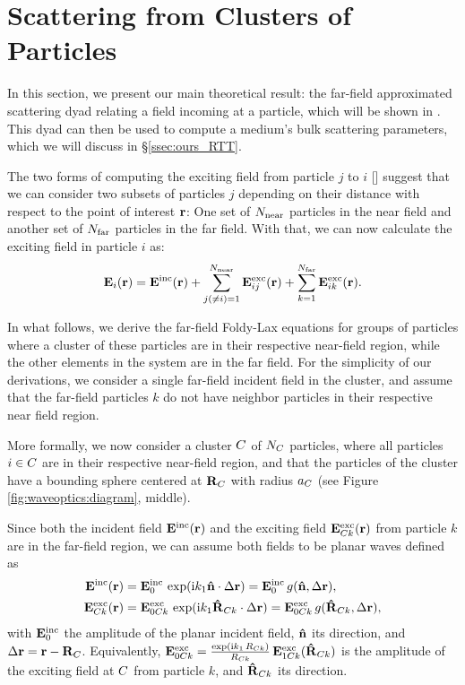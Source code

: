 \section{Scattering from Clusters of Particles}
\label{sec:waveoptics:ours_theory}

In this section, we present our main theoretical result: the far-field approximated scattering dyad relating a field incoming at a particle, which will be shown in .
This dyad can then be used to compute a medium's bulk scattering parameters, which we will discuss in \S\ref{ssec:ours_RTT}.

The two forms of computing the exciting field from particle $j$ to $i$ [] suggest that we can consider two subsets of particles $j$ depending on their distance with respect to the point of interest $\mathbf{r}$: One set of ${N_{\text{near}}}$ particles in the near field and another set of ${N_{\text{far}}}$ particles in the far field. With that, we can now calculate the exciting field in particle $i$ as:
\begin{equation}
    \mathbf{E}_i(\mathbf{r})= \mathbf{E}^\text{inc}(\mathbf{r}) + \sum_{j(\neq i)=1}^{N_{\text{near}}} \mathbf{E}^\text{exc}_{ij}(\mathbf{r}) + \sum_{k=1}^{N_{\text{far}}} \mathbf{E}^\text{exc}_{ik}(\mathbf{r}).
    \label{eq:foldylaxtwo}
\end{equation}

In what follows, we derive the far-field Foldy-Lax equations for groups of particles where a cluster of these particles are in their respective near-field region, while the other elements in the system are in the far field. For the simplicity of our derivations, we consider a single far-field incident field in the cluster, and assume that the far-field particles $k$ do not have neighbor particles in their respective near field region.

More formally, we now consider a cluster $C$ of $N_C$ particles, where all particles $i\in C$ are in their respective near-field region, and that the particles of the cluster have a bounding sphere centered at $\mathbf{R}_C$ with radius $a_C$ (see Figure \ref{fig:waveoptics:diagram}, middle). 

Since both the incident field $\mathbf{E}^\text{inc}(\mathbf{r})$ and the exciting field $\mathbf{E}^\text{exc}_{C k}(\mathbf{r})$ from particle $k$ are in the far-field region, we can assume both fields to be planar waves defined as
\begin{align}
    \label{eq:farincfieldcluster}
    \mathbf{E}^\text{inc}(\mathbf{r}) &= \mathbf{E}^\text{inc}_0 \,\exp(\text{i} k_1 \mathbf{\hat{n}} \cdot \Delta \mathbf{r}) = \mathbf{E}^\text{inc}_0\,g(\mathbf{\hat{n}}, \Delta \mathbf{r}) , \\
    \mathbf{E}^\text{exc}_{C k}(\mathbf{r}) &= \mathbf{E}^\text{exc}_{0C k}\,\exp(\text{i} k_1 \mathbf{\hat{R}}_{C k} \cdot \Delta \mathbf{r}) =  \mathbf{E}^\text{exc}_{0C k}\,g(\mathbf{\hat{R}}_{C k}, \Delta \mathbf{r}), 
    \label{eq:farexcfieldcluster} 
\end{align}
with $\mathbf{E}^\text{inc}_0$ the amplitude of the planar incident field, $\mathbf{\hat{n}}$ its direction, and $\Delta \mathbf{r}=\mathbf{r}-\mathbf{R}_C$. Equivalently, $\mathbf{E}^\text{exc}_{0C k}=\frac{\exp(\text{i} k_1 \,R_{C k})}{R_{C k}}\,\mathbf{E}^\text{exc}_{1C k}(\mathbf{\hat{R}}_{C k})$  is the amplitude of the exciting field at $C$ from particle $k$, and $\mathbf{\hat{R}}_{C k}$ its direction. 

